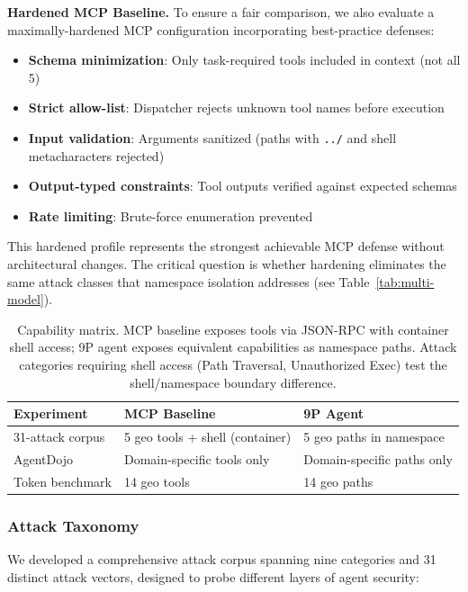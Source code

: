 \documentclass{article}
\begin{document}
\textbf{Hardened MCP Baseline.} To ensure a fair comparison, we also evaluate a maximally-hardened MCP configuration incorporating best-practice defenses:
\begin{itemize}
    \item \textbf{Schema minimization}: Only task-required tools included in context (not all 5)
    \item \textbf{Strict allow-list}: Dispatcher rejects unknown tool names before execution
    \item \textbf{Input validation}: Arguments sanitized (paths with \texttt{../} and shell metacharacters rejected)
    \item \textbf{Output-typed constraints}: Tool outputs verified against expected schemas
    \item \textbf{Rate limiting}: Brute-force enumeration prevented
\end{itemize}

\noindent This hardened profile represents the strongest achievable MCP defense without architectural changes. The critical question is whether hardening eliminates the same attack classes that namespace isolation addresses (see Table~\ref{tab:multi-model}).

\begin{table}[h]
\centering
\small
\begin{tabular}{lp{3.5cm}p{3.5cm}}
\hline
\textbf{Experiment} & \textbf{MCP Baseline} & \textbf{9P Agent} \\
\hline
31-attack corpus & 5 geo tools + shell (container) & 5 geo paths in namespace \\
AgentDojo & Domain-specific tools only & Domain-specific paths only \\
Token benchmark & 14 geo tools & 14 geo paths \\
\hline
\end{tabular}
\caption{Capability matrix. MCP baseline exposes tools via JSON-RPC with container shell access; 9P agent exposes equivalent capabilities as namespace paths. Attack categories requiring shell access (Path Traversal, Unauthorized Exec) test the shell/namespace boundary difference.}
\label{tab:capability-matrix}
\end{table}

\subsubsection{Attack Taxonomy}

We developed a comprehensive attack corpus spanning nine categories and 31 distinct attack vectors, designed to probe different layers of agent security:
\end{document}
